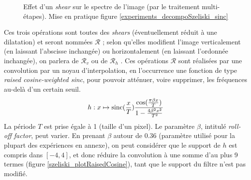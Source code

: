 \begin{figure}
		\caption{Effet d'un \emph{shear} sur le spectre de l'image (par le traitement multi-étapes). Mise en pratique figure \ref{experiments_decompoSzeliski_sinc}}
		\label{szeliski_decompoSzeliski}
	\end{figure}
	
	Ces trois opérations sont toutes des \emph{shears} (éventuellement réduit à une dilatation) et seront nommées $\mathcal R$ ; selon qu'elles modifient l'image verticalement (en laissant l'abscisse inchangée) ou horizontalement (en laissant l'ordonnée inchangée), on parlera de $\mathcal R_v$ ou de $\mathcal R_h$ . Ces opérations $\mathcal R$ sont réalisées par une convolution par un noyau d'interpolation, en l'occurrence une fonction de type \emph{raised cosine-weighted sinc}, pour pouvoir atténuer, voire supprimer, les fréquences au-delà d'un certain seuil.
	\begin{equation}
	h : x \mapsto \operatorname{sinc}(\frac{x}{T})\frac{\cos(\frac{\pi\beta x}{T})}{1-\frac{4\beta^2x^2}{T^2}}
	\label{szeliski_definition_raisedCosineWeightedSinc}
	\end{equation}
	La période $T$ est prise égale à 1 (taille d'un pixel).
	Le paramètre $\beta$, intitulé \emph{roll-off factor}, peut varier. En prenant $\beta$ autour de $0.36$ (paramètre utilisé pour la plupart des expériences en annexe), on peut considérer que le support de $h$ est compris dans $[-4,4]$, et donc réduire la convolution à une somme d'au plus 9 termes (figure \ref{szeliski_plotRaisedCosine}), tant que le support du filtre n'est pas modifié.
	
